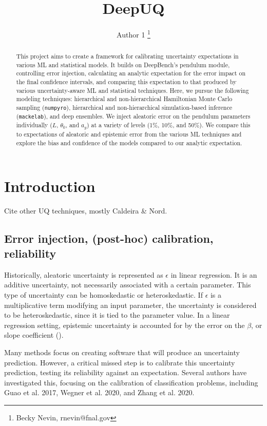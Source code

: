 \documentclass[twocolumn]{aastex631}
\begin{document}
\title{DeepUQ} %

\author{Author 1 \thanks{Becky Nevin, rnevin@fnal.gov}}


\begin{abstract}
    This project aims to create a framework for calibrating uncertainty expectations in various ML and statistical models.
    It builds on DeepBench's pendulum module, controlling error injection, calculating an analytic expectation for the error impact on the final confidence intervals, and comparing this expectation to that produced by various uncertainty-aware ML and statistical techniques.
    Here, we pursue the following modeling techniques: hierarchical and non-hierarchical Hamiltonian Monte Carlo sampling (\texttt{numpyro}), hierarchical and non-hierarchical simulation-based inference (\texttt{mackelab}), and deep ensembles.
    We inject aleatoric error on the pendulum parameters individually ($L$, $\theta_0$, and $a_g$) at a variety of levels (1\%, 10\%, and 50\%).
    We compare this to expectations of aleatoric and epistemic error from the various ML techniques and explore the bias and confidence of the models compared to our analytic expectation.
\end{abstract}

\section{Introduction}
Cite other UQ techniques, mostly Caldeira \& Nord.

\subsection{Error injection, (post-hoc) calibration, reliability}
Historically, aleatoric uncertainty is represented as $\epsilon$ in linear regression.
It is an additive uncertainty, not necessarily associated with a certain parameter.
This type of uncertainty can be homoskedastic or heteroskedastic.
If $\epsilon$ is a multiplicative term modifying an input parameter, the uncertainty is considered to be heteroskedastic, since it is tied to the parameter value.
In a linear regression setting, epistemic uncertainty is accounted for by the error on the $\beta$, or slope coefficient (\citealt{Nagl2022}).

Many methods focus on creating software that will produce an uncertainty prediction.
However, a critical missed step is to calibrate this uncertainty prediction, testing its reliability against an expectation.
Several authors have investigated this, focusing on the calibration of classification problems, including Guao et al. 2017, Wegner et al. 2020, and Zhang et al. 2020.
\end{document}
